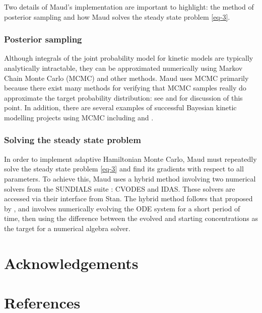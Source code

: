 \documentclass[journal=,manuscript=]{achemso}
\begin{document}
Two details of Maud's implementation are important to highlight: the
method of posterior sampling and how Maud solves the steady state
problem \eqref{eq-3}.

\hypertarget{posterior-sampling}{%
\subsubsection{Posterior sampling}\label{posterior-sampling}}

Although integrals of the joint probability model for kinetic models are
typically analytically intractable, they can be approximated numerically
using Markov Chain Monte Carlo (MCMC) and other methods. Maud uses MCMC
primarily because there exist many methods for verifying that MCMC
samples really do approximate the target probability distribution: see
\citet{vehtariRankNormalizationFoldingLocalization2021} and
\citet{taltsValidatingBayesianInference2018} for discussion of this
point. In addition, there are several examples of successful Bayesian
kinetic modelling projects using MCMC including
\citet{st.johnBayesianInferenceMetabolic2018} and
\citet{xingModelingKineticsLargescale2010}.

\hypertarget{solving-the-steady-state-problem}{%
\subsubsection{Solving the steady state
problem}\label{solving-the-steady-state-problem}}

In order to implement adaptive Hamiltonian Monte Carlo, Maud must
repeatedly solve the steady state problem \eqref{eq-3} and find its
gradients with respect to all parameters. To achieve this, Maud uses a
hybrid method involving two numerical solvers from the SUNDIALS suite
\citep{serbanCVODESSensitivityEnabledODE2005}: CVODES and IDAS. These
solvers are accessed via their interface from Stan. The hybrid method
follows that proposed by \citet{margossianComputingSteadyStates2018},
and involves numerically evolving the ODE system for a short period of
time, then using the difference between the evolved and starting
concentrations as the target for a numerical algebra solver.

\hypertarget{acknowledgements}{%
\section{Acknowledgements}\label{acknowledgements}}

\hypertarget{references}{%
\section{References}\label{references}}

\renewcommand{\bibsection}{}

\end{document}
